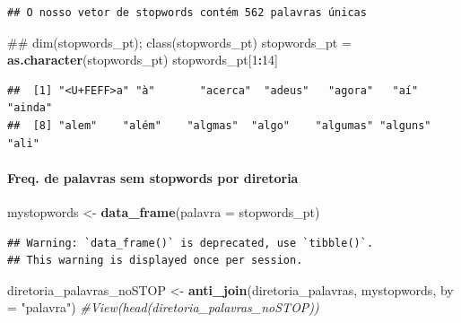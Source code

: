 \documentclass[]{article}
\newenvironment{Shaded}{\begin{snugshade}}{\end{snugshade}}
\newcommand{\KeywordTok}[1]{\textcolor[rgb]{0.13,0.29,0.53}{\textbf{#1}}}
\newcommand{\DataTypeTok}[1]{\textcolor[rgb]{0.13,0.29,0.53}{#1}}
\newcommand{\DecValTok}[1]{\textcolor[rgb]{0.00,0.00,0.81}{#1}}
\newcommand{\StringTok}[1]{\textcolor[rgb]{0.31,0.60,0.02}{#1}}
\newcommand{\CommentTok}[1]{\textcolor[rgb]{0.56,0.35,0.01}{\textit{#1}}}
\newcommand{\OperatorTok}[1]{\textcolor[rgb]{0.81,0.36,0.00}{\textbf{#1}}}
\newcommand{\NormalTok}[1]{#1}
\let\oldparagraph\paragraph
\renewcommand{\paragraph}[1]{\oldparagraph{#1}\mbox{}}
\begin{document}
\begin{verbatim}
## O nosso vetor de stopwords contém 562 palavras únicas
\end{verbatim}

\begin{Shaded}
\begin{Highlighting}[]
\NormalTok{## dim(stopwords_pt); class(stopwords_pt)}
\NormalTok{stopwords_pt =}\StringTok{ }\KeywordTok{as.character}\NormalTok{(stopwords_pt)}
\NormalTok{stopwords_pt[}\DecValTok{1}\OperatorTok{:}\DecValTok{14}\NormalTok{]}
\end{Highlighting}
\end{Shaded}

\begin{verbatim}
##  [1] "<U+FEFF>a" "à"       "acerca"  "adeus"   "agora"   "aí"      "ainda"  
##  [8] "alem"    "além"    "algmas"  "algo"    "algumas" "alguns"  "ali"
\end{verbatim}

\paragraph{\texorpdfstring{Freq. de palavras sem \textbf{stopwords} por
diretoria}{Freq. de palavras sem stopwords por diretoria}}\label{freq.-de-palavras-sem-stopwords-por-diretoria}

\begin{Shaded}
\begin{Highlighting}[]
\NormalTok{mystopwords <-}\StringTok{ }\KeywordTok{data_frame}\NormalTok{(}\DataTypeTok{palavra =}\NormalTok{ stopwords_pt)}
\end{Highlighting}
\end{Shaded}

\begin{verbatim}
## Warning: `data_frame()` is deprecated, use `tibble()`.
## This warning is displayed once per session.
\end{verbatim}

\begin{Shaded}
\begin{Highlighting}[]
\NormalTok{diretoria_palavras_noSTOP <-}\StringTok{ }\KeywordTok{anti_join}\NormalTok{(diretoria_palavras, mystopwords, }\DataTypeTok{by =} \StringTok{"palavra"}\NormalTok{)}
\CommentTok{#View(head(diretoria_palavras_noSTOP))}
\end{Highlighting}
\end{Shaded}
\end{document}
